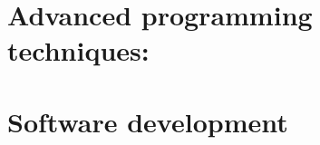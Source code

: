 \documentclass[a4paper,10pt,twoside,english]{book}
\begin{document}
        
  
  \part{Advanced programming techniques: }\label{PartIII}
       
              
       
        
       
       
       
       
       
       
  
   

  \part{Software development}\label{PartIV}
    
    
  
    
   
    
    \backmatter
    
    
    
\end{document}

